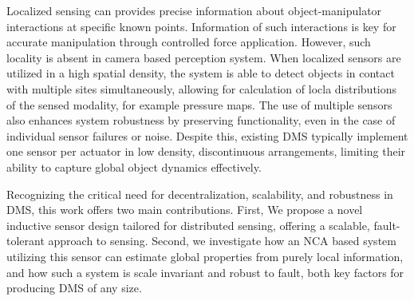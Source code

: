 Localized sensing can provides precise information about object-manipulator interactions at specific known points. Information of such interactions is key for accurate manipulation through controlled force application. However, such locality is absent in camera based perception system. When localized sensors are utilized in a high spatial density, the system is able to detect objects in contact with multiple sites simultaneously, allowing for calculation of  locla distributions of the sensed modality, for example pressure maps. The use of multiple sensors also enhances system robustness by preserving functionality, even in the case of individual sensor failures or noise. Despite this, existing \ac{DMS} typically implement one sensor per actuator in low density, discontinuous arrangements, limiting their ability to capture global object dynamics effectively.





Recognizing the critical need for decentralization, scalability, and robustness in \ac{DMS}, this work offers two main contributions. First, We propose a novel inductive sensor design tailored for distributed sensing, offering a scalable, fault-tolerant approach to sensing. Second, we investigate how an \acf{NCA} based system utilizing this sensor can estimate global properties from purely local information, and how such a system is scale invariant and robust to fault, both key factors for producing \ac{DMS} of any size.





